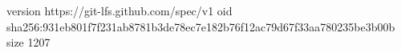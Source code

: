 version https://git-lfs.github.com/spec/v1
oid sha256:931eb801f7f231ab8781b3de78ec7e182b76f12ac79d67f33aa780235be3b00b
size 1207

